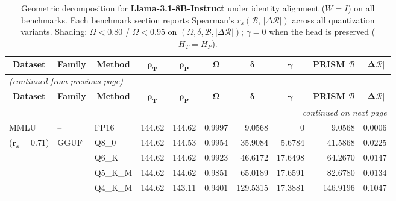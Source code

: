 \begingroup
\small
\setlength{\tabcolsep}{4pt}
\renewcommand{\arraystretch}{1.05}
\setlength{\LTcapwidth}{\textwidth}
\begin{longtable}{ll l rrrrrrr}
\caption{Geometric decomposition for \textbf{Llama-3.1-8B-Instruct} under identity alignment ($W{=}I$) on all benchmarks. Each benchmark section reports Spearman's $r_s(\mathcal{B},\,|\Delta\mathcal{R}|)$ across all quantization variants. Shading: \colorbox{red!35}{$\Omega{<}0.80$} / \colorbox{red!18}{$\Omega{<}0.95$} on $(\Omega,\delta,\mathcal{B},|\Delta\mathcal{R}|)$; \colorbox{cyan!12}{$\gamma{=}0$} when the head is preserved ($H_T{=}H_P$).}\label{tab:llama_instruct_decomposition_all_bound}\\
\toprule
\multicolumn{1}{c}{\textbf{Dataset}} & \multicolumn{1}{c}{\textbf{Family}} & \multicolumn{1}{c}{\textbf{Method}} & \multicolumn{1}{c}{$\boldsymbol{\rho_T}$} & \multicolumn{1}{c}{$\boldsymbol{\rho_P}$} & \multicolumn{1}{c}{$\boldsymbol{\Omega}$} & \multicolumn{1}{c}{$\boldsymbol{\delta}$} & \multicolumn{1}{c}{$\boldsymbol{\gamma}$} & \multicolumn{1}{c}{\textbf{PRISM} $\boldsymbol{\mathcal{B}}$} & \multicolumn{1}{c}{$\boldsymbol{|\Delta\mathcal{R}|}$} \\
\midrule
\endfirsthead
\multicolumn{10}{l}{\small\itshape (continued from previous page)}\\
\toprule
\multicolumn{1}{c}{\textbf{Dataset}} & \multicolumn{1}{c}{\textbf{Family}} & \multicolumn{1}{c}{\textbf{Method}} & \multicolumn{1}{c}{$\boldsymbol{\rho_T}$} & \multicolumn{1}{c}{$\boldsymbol{\rho_P}$} & \multicolumn{1}{c}{$\boldsymbol{\Omega}$} & \multicolumn{1}{c}{$\boldsymbol{\delta}$} & \multicolumn{1}{c}{$\boldsymbol{\gamma}$} & \multicolumn{1}{c}{\textbf{PRISM} $\boldsymbol{\mathcal{B}}$} & \multicolumn{1}{c}{$\boldsymbol{|\Delta\mathcal{R}|}$} \\
\midrule
\endhead
\midrule
\multicolumn{10}{r}{\small\itshape continued on next page}\\
\endfoot
\bottomrule
\endlastfoot
MMLU & -- & FP16 & 144.62 & 144.62 & 0.9997 & 9.0568 & \cellcolor{cyan!12} $0$ & 9.0568 & 0.0006 \\
{\small ($\mathbf{r_s{=}0.71}$)} & GGUF & Q8\_0 & 144.62 & 144.53 & 0.9954 & 35.9084 & 5.6784 & 41.5868 & 0.0225 \\
 &  & Q6\_K & 144.62 & 144.62 & 0.9923 & 46.6172 & 17.6498 & 64.2670 & 0.0147 \\
 &  & Q5\_K\_M & 144.62 & 144.62 & 0.9851 & 65.0189 & 17.6591 & 82.6780 & 0.0134 \\
 &  & Q4\_K\_M & 144.62 & 143.11 & \cellcolor{red!18} 0.9401 & \cellcolor{red!18} 129.5315 & 17.3881 & \cellcolor{red!18} 146.9196 & \cellcolor{red!18} 0.1047 \\

\end{longtable}
